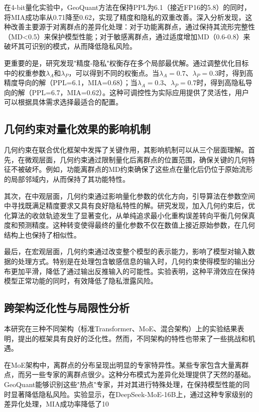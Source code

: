 在4-bit量化实验中，GeoQuant方法在保持PPL为6.1（接近FP16的5.8）的同时，将MIA成功率从0.71降至0.62，实现了精度和隐私的双重改善。深入分析发现，这种改善主要源于对离群点的差异化处理：对于功能离群点，通过保持其流形完整性（MD<0.5）来保护模型性能；对于敏感离群点，通过适度增加MD（0.6-0.8）来破坏其可识别的模式，从而降低隐私风险。

更重要的是，研究发现"精度-隐私"权衡存在多个局部最优解。通过调整优化目标中的权重参数$\lambda_A$和$\lambda_P$，可以得到不同的权衡点。当$\lambda_A=0.7$、$\lambda_P=0.3$时，得到高精度导向的解（PPL=6.1，MIA=0.68）；当$\lambda_A=0.3$、$\lambda_P=0.7$时，得到高隐私导向的解（PPL=6.7，MIA=0.62）。这种可调控性为实际应用提供了灵活性，用户可以根据具体需求选择最适合的配置。

\subsection{几何约束对量化效果的影响机制}

几何约束在联合优化框架中发挥了关键作用，其影响机制可以从三个层面理解。首先，在微观层面，几何约束通过限制量化后离群点的位置范围，确保关键的几何特征不被破坏。例如，功能离群点的MD约束确保了这些点在量化后仍位于原始流形的局部邻域内，从而保持了其功能特性。

其次，在中观层面，几何约束通过影响量化参数的优化方向，引导算法在参数空间中寻找既满足精度要求又具有良好隐私特性的解。研究发现，加入几何约束后，优化算法的收敛轨迹发生了显著变化，从单纯追求最小化重构误差转向平衡几何保真度和预测精度。这种转变使得最终的量化参数不仅在数值上接近原始参数，在几何结构上也保持了相似性。

最后，在宏观层面，几何约束通过改变整个模型的表示能力，影响了模型对输入数据的处理方式。特别是在处理包含敏感信息的输入时，几何约束使得模型的输出分布更加平滑，降低了通过输出反推输入的可能性。实验表明，这种平滑效应在保持模型正常功能的同时，有效降低了隐私泄露风险。

\subsection{跨架构泛化性与局限性分析}

本研究在三种不同架构（标准Transformer、MoE、混合架构）上的实验结果表明，提出的框架具有良好的泛化性。然而，不同架构的特性也带来了一些挑战和机遇。

在MoE架构中，离群点的分布呈现出明显的专家特异性。某些专家包含大量离群点，而另一些专家的离群点很少。这种分布模式为差异化处理提供了天然的基础。GeoQuant能够识别这些"热点"专家，并对其进行特殊处理，在保持模型性能的同时显著降低隐私风险。实验显示，在DeepSeek-MoE-16B上，通过这种专家级别的差异化处理，MIA成功率降低了10%

